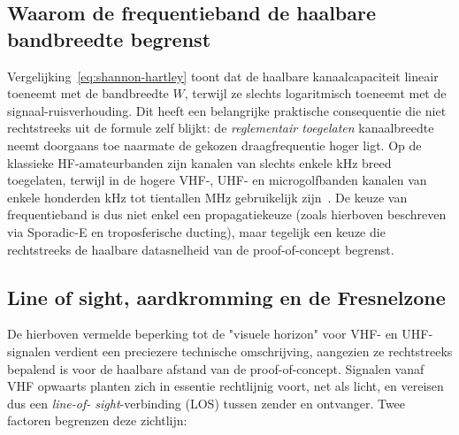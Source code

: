 \subsection{Waarom de frequentieband de haalbare bandbreedte begrenst}%
\label{subsec:frequentie-kanaalbreedte}

Vergelijking~\eqref{eq:shannon-hartley} toont dat de haalbare kanaalcapaciteit lineair
toeneemt met de bandbreedte $W$, terwijl ze slechts logaritmisch toeneemt met de
signaal-ruisverhouding. Dit heeft een belangrijke praktische consequentie die niet
rechtstreeks uit de formule zelf blijkt: de \emph{reglementair toegelaten}
kanaalbreedte neemt doorgaans toe naarmate de gekozen draagfrequentie hoger ligt. Op de
klassieke HF-amateurbanden zijn kanalen van slechts enkele kHz breed toegelaten, terwijl
in de hogere VHF-, UHF- en microgolfbanden kanalen van enkele honderden kHz tot
tientallen MHz gebruikelijk zijn~\autocite{BIPT2019,UBAFrequenties}. De keuze van
frequentieband is dus niet enkel een propagatiekeuze (zoals hierboven beschreven via
Sporadic-E en troposferische ducting), maar tegelijk een keuze die rechtstreeks de
haalbare datasnelheid van de proof-of-concept begrenst.


\subsection{Line of sight, aardkromming en de Fresnelzone}%
\label{subsec:line-of-sight}

De hierboven vermelde beperking tot de "visuele horizon" voor VHF- en UHF-signalen
verdient een preciezere technische omschrijving, aangezien ze rechtstreeks bepalend is
voor de haalbare afstand van de proof-of-concept. Signalen vanaf VHF opwaarts planten
zich in essentie rechtlijnig voort, net als licht, en vereisen dus een \textit{line-of-
sight}-verbinding (LOS) tussen zender en ontvanger. Twee factoren begrenzen deze
zichtlijn:

